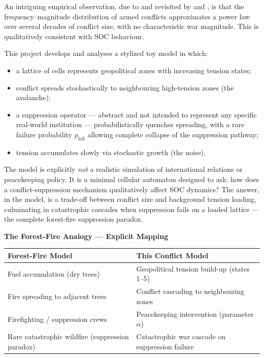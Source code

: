 \documentclass[12pt,a4paper]{article}
\begin{document}
An intriguing empirical observation, due to \citet{richardson1948} and revisited by
\citet{cederman2003} and \citet{clauset2009}, is that the frequency--magnitude
distribution of armed conflicts approximates a power law over several decades of
conflict size, with no characteristic war magnitude. This is qualitatively consistent
with SOC behaviour.

This project develops and analyses a stylized toy model in which:
\begin{itemize}[leftmargin=1.5em]
  \item a lattice of cells represents geopolitical zones with increasing tension states;
  \item conflict spreads stochastically to neighbouring high-tension zones (the avalanche);
  \item a suppression operator --- abstract and not intended to represent any specific
        real-world institution --- probabilistically quenches spreading, with a rare failure
        probability $p_{\text{fail}}$ allowing complete collapse of the suppression pathway;
  \item tension accumulates slowly via stochastic growth (the noise).
\end{itemize}

The model is explicitly \emph{not} a realistic simulation of international relations or
peacekeeping policy. It is a minimal cellular automaton designed to ask: how does a
conflict-suppression mechanism qualitatively affect SOC dynamics? The answer, in the
model, is a trade-off between conflict size and background tension loading, culminating
in catastrophic cascades when suppression fails on a loaded lattice --- the complete
forest-fire suppression paradox.

\medskip
\begin{mdframed}[style=infobox]
\textbf{The Forest-Fire Analogy --- Explicit Mapping}\\[6pt]
\begin{tabular}{@{}p{}p{}@{}}
\toprule
\textbf{Forest-Fire Model} & \textbf{This Conflict Model} \\
\midrule
Fuel accumulation (dry trees) & Geopolitical tension build-up (states 1--5) \\[4pt]
Fire spreading to adjacent trees & Conflict cascading to neighbouring zones \\[4pt]
Firefighting / suppression crews & Peacekeeping intervention (parameter $\alpha$) \\[4pt]
Rare catastrophic wildfire (suppression paradox) & Catastrophic war cascade on suppression failure \\
\bottomrule
\end{tabular}
\end{mdframed}
\medskip
\end{document}
